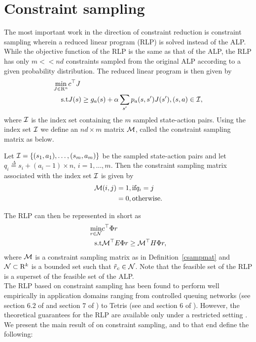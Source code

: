\section{Constraint sampling}
The most important work in the direction of constraint reduction is constraint sampling \cite{CS} wherein a reduced linear program (RLP) is solved instead of the ALP. While the objective function of the RLP is the same as that of the ALP, the RLP has only $m<<nd$ constraints sampled from the original ALP according to a given probability distribution. The reduced linear program is then given by
\small
\begin{align}\label{rlp}
\min_{J\in \R^n} &c^\top J\nn\\
\text{s.t}\mb &J(s)\geq g_a(s)+\alpha\sum_{s'}p_a(s,s')J(s'), \mb (s,a) \in \I,
\end{align}
\normalsize
where $\mathcal{I}$ is the index set containing the $m$ sampled state-action pairs. Using the index set $\mathcal{I}$ we define an $nd\times m$ matrix $\mathcal{M}$, called the constraint sampling matrix as below.
\begin{definition}\label{csampmat}
Let $\mathcal{I}=\{(s_1,a_1),\ldots,(s_m,a_m)\}$ be the sampled state-action pairs and let $q_i\stackrel{\Delta}{=}s_i+(a_i-1)\times n$, $i=1,\ldots,m$. Then the constraint sampling matrix associated with the index set $\mathcal{I}$ is given by
\begin{align}
\mathcal{M}(i,j)&=1, \relax{ }\text{if}\relax{ } q_i=j\nonumber\\
&=0, \relax{ }\text{otherwise}.
\end{align}
\end{definition}
The RLP can then be represented in short as
\begin{align}\label{rlpshort}
\min_{r\in \N} &c^\top \Phi r\nn\\
\text{s.t}\mb & \M^\top E \Phi r \geq \M^\top H \Phi r,
\end{align}
where $\mathcal{M}$ is a constraint sampling matrix as in Definition~\ref{csampmat} and $\mathcal{N}\subset \mathrm{R}^k$ is a bounded set such that $\tilde{r}_c \in \mathcal{N}$. Note that the feasible set of the RLP is a superset of the feasible set of the ALP.\\
The RLP based on constraint sampling has been found to perform well empirically in application domains ranging from controlled queuing networks (see section $6.2$ of \cite{ALP} and section $7$ of \cite{SALP}) to Tetris (see \cite{CST} and section $6$ of \cite{SALP}). However, the theoretical guarantees for the RLP are available only under a restricted setting \cite{CS}. We present the main result of \cite{CS} on constraint sampling, and to that end define the following:

